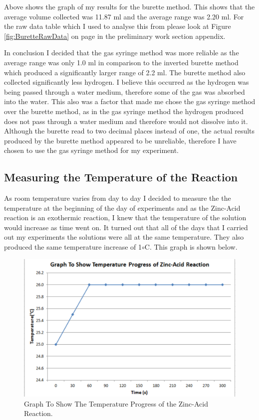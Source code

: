 Above shows the graph of my results for the burette method. This shows that the average volume collected was 11.87 ml and the average range was 2.20 ml. For the raw data table which I used to analyse this from please look at Figure \ref{fig:BuretteRawData} on page \pageref{fig:BuretteRawData} in the preliminary work section appendix.



In conclusion I decided that the gas syringe method was more reliable as the average range was only 1.0 ml in comparison to the inverted burette method which produced a significantly larger range of 2.2 ml.  The burette method also collected significantly less hydrogen. I believe this occurred as the hydrogen was being passed through a water medium, therefore some of the gas was absorbed into the water. This also was a factor that made me chose the gas syringe method over the burette method, as in the gas syringe method the hydrogen produced does not pass through a water medium and therefore would not dissolve into it. Although the burette read to two decimal places instead of one, the actual results produced by the burette method appeared to be unreliable, therefore I have chosen to use the gas syringe method for my experiment.




	\subsection{Measuring the Temperature of the Reaction}

As room temperature varies from day to day I decided to measure the the temperature at the beginning of the day of experiments and as the Zinc-Acid reaction is an exothermic reaction, I knew that the temperature of the solution would increase as time went on. It turned out that all of the days that I carried out my experiments the solutions were all at the same temperature. They also produced the same temperature increase of 1$\circ$C. This graph is shown below.


\begin{figure}[H]
    \includegraphics[width=\textwidth]{./preliminarywork/graphs/Temperature.pdf}
    \caption{Graph To Show The Temperature Progress of the Zinc-Acid Reaction.} \label{fig:Temperature Graph}
\end{figure}

